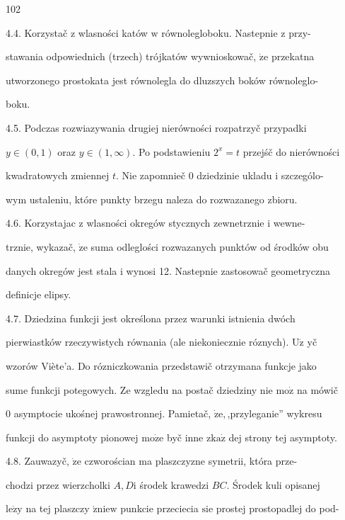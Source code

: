 \documentclass[a4paper,12pt]{article}
\begin{document}
102

4.4. Korzystač $\mathrm{z}$ wlasności katów $\mathrm{w}$ równolegloboku. Nastepnie $\mathrm{z}$ przy-

stawania odpowiednich (trzech) trójkatów wywnioskowač, $\dot{\mathrm{z}}\mathrm{e}$ przekatna

utworzonego prostokata jest równolegla do dluzszych boków równoleglo-

boku.

4.5. Podczas rozwiazywania drugiej nierówności rozpatrzyč przypadki

$ y\in (0,1)$ oraz $ y\in (1,\infty)$. Po podstawieniu $2^{x}=t$ przejśč do nierówności

kwadratowych zmiennej $t$. Nie zapomnieč $0$ dziedzinie ukladu $\mathrm{i}$ szczególo-

wym ustaleniu, które punkty brzegu naleza do rozwazanego zbioru.

4.6. Korzystajac $\mathrm{z}$ wlasności okregów stycznych zewnetrznie $\mathrm{i}$ wewne-

trznie, wykazač, $\dot{\mathrm{z}}\mathrm{e}$ suma odleglości rozwazanych punktów od środków obu

danych okregów jest stala $\mathrm{i}$ wynosi 12. Nastepnie zastosowač geometryczna

definicje elipsy.

4.7. Dziedzina funkcji jest określona przez warunki istnienia dwóch

pierwiastków rzeczywistych równania (ale niekoniecznie róznych). $\mathrm{U}\dot{\mathrm{z}}$ yč

wzorów Viète'a. Do rózniczkowania przedstawič otrzymana funkcje jako

sume funkcji potegowych. Ze wzgledu na postač dziedziny nie $\mathrm{m}\mathrm{o}\dot{\mathrm{z}}$ na mówič

$0$ asymptocie ukośnej prawostronnej. Pamietač, $\dot{\mathrm{z}}\mathrm{e},$,przyleganie'' wykresu

funkcji do asymptoty pionowej $\mathrm{m}\mathrm{o}\dot{\mathrm{z}}\mathrm{e}$ byč inne $\mathrm{z}\mathrm{k}\mathrm{a}\dot{\mathrm{z}}$ dej strony tej asymptoty.

4.8. Zauwazyč, $\dot{\mathrm{z}}\mathrm{e}$ czworościan ma plaszczyzne symetrii, która prze-

chodzi przez wierzcholki $A, D\mathrm{i}$ środek krawedzi $BC$. Środek kuli opisanej

$\mathrm{l}\mathrm{e}\dot{\mathrm{z}}\mathrm{y}$ na tej plaszczy $\acute{\mathrm{z}}\mathrm{n}\mathrm{i}\mathrm{e}\mathrm{w}$ punkcie przeciecia $\mathrm{s}\mathrm{i}\mathrm{e}$ prostej prostopadlej do pod-
\end{document}
